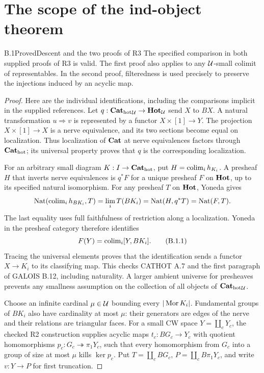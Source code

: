 \section{The scope of the ind-object theorem}

\begin{claim}{B.1}{Proved}{Descent and the two proofs of R3}
The specified comparison in both supplied proofs of R3 is valid. The first proof also applies to any $\mathcal U$-small colimit of representables. In the second proof, filteredness is used precisely to preserve the injections induced by an acyclic map.
\end{claim}
\begin{proof}
Here are the individual identifications, including the comparisons implicit in the supplied references. Let $q:{\mathbf{Cat}_{\mathrm{hot}}}_\mathcal U\to\mathbf{Hot}_\mathcal U$ send $X$ to $BX$. A natural transformation $u\Rightarrow v$ is represented by a functor $X\times[1]\to Y$. The projection $X\times[1]\to X$ is a nerve equivalence, and its two sections become equal on localization. Thus localization of $\mathbf{Cat}$ at nerve equivalences factors through ${\mathbf{Cat}_{\mathrm{hot}}}$; its universal property proves that $q$ is the corresponding localization.

For an arbitrary small diagram $K:I\to{\mathbf{Cat}_{\mathrm{hot}}}$, put $H=\operatorname{colim}_i h_{K_i}$. A presheaf $H$ that inverts nerve equivalences is $q^*F$ for a unique presheaf $F$ on $\mathbf{Hot}$, up to its specified natural isomorphism. For any presheaf $T$ on $\mathbf{Hot}$, Yoneda gives
\[
 \operatorname{Nat}(\operatorname{colim}_i h_{BK_i},T)
 =\lim_iT(BK_i)
 =\operatorname{Nat}(H,q^*T)
 =\operatorname{Nat}(F,T).
\]
The last equality uses full faithfulness of restriction along a localization. Yoneda in the presheaf category therefore identifies
\[
 F(Y)=\operatorname{colim}_i[Y,BK_i]. \tag{B.1.1}
\]
Tracing the universal elements proves that the identification sends a functor $X\to K_i$ to its classifying map. This checks CATHOT A.7 and the first paragraph of GALOIS B.12, including naturality. A larger ambient universe for presheaves prevents any smallness assumption on the collection of all objects of ${\mathbf{Cat}_{\mathrm{hot}}}_\mathcal U$.

Choose an infinite cardinal $\mu\in\mathcal U$ bounding every $|\operatorname{Mor} K_i|$. Fundamental groups of $BK_i$ also have cardinality at most $\mu$: their generators are edges of the nerve and their relations are triangular faces. For a small CW space $Y=\coprod_cY_c$, the checked R2 construction supplies acyclic maps $t_c:BG_c\to Y_c$ with quotient homomorphisms $p_c:G_c\twoheadrightarrow\pi_1Y_c$, such that every homomorphism from $G_c$ into a group of size at most $\mu$ kills $\ker p_c$. Put $T=\coprod_cBG_c$, $P=\coprod_cB\pi_1Y_c$, and write $v:Y\to P$ for first truncation.


\end{proof}

